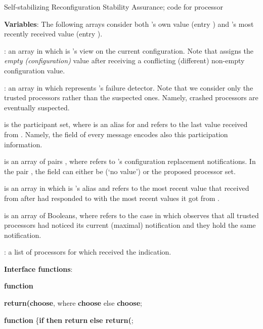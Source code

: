 \documentclass[11pt]{article}
\begin{document}
\begin{algorithm*}[t!]


\caption{Self-stabilizing Reconfiguration Stability Assurance; code for processor }
\label{alg:disCongif}
\begin{footnotesize}
{\bf Variables}:
The following arrays consider both 's own value (entry ) and 's most recently received value (entry ).  

: an array in which  is 's view on the current configuration.
Note that  assigns the \emph{empty (configuration)} value  after receiving a conflicting (different) non-empty configuration value. 

: an array in which  represents 's failure detector. 
Note that we consider only the trusted processors rather than the suspected ones. Namely, crashed processors are eventually suspected. 

 is the participant set, where  is an alias for  and  refers to the last value received from . Namely, the  field of every message encodes also this participation information.



 is an array of pairs , where  refers to 's configuration replacement notifications.
In the pair , the field  can either be  (`no value') or the proposed processor set. 


 is an array in which  is 's alias and  refers to the most recent value that  received from  after  had responded to  with the most recent values it got from .


 is an array of Booleans, where  refers to the case in which  observes that all trusted processors had noticed its current (maximal) notification and they hold the same notification. 





: a list of processors  for which  received the  indication. 

\vspace{0.35em}

{\bf Interface functions}:



{\bf function} \label{ln:chsConfig} 
 
{\bf return(choose}, where {\bf choose} else {\bf choose};\ 



{\bf function} \label{ln:getConfig}  \{{\bf if}  {\bf then return} {\bf else return(};\






\end{footnotesize}
\end{algorithm*}
\end{document}
